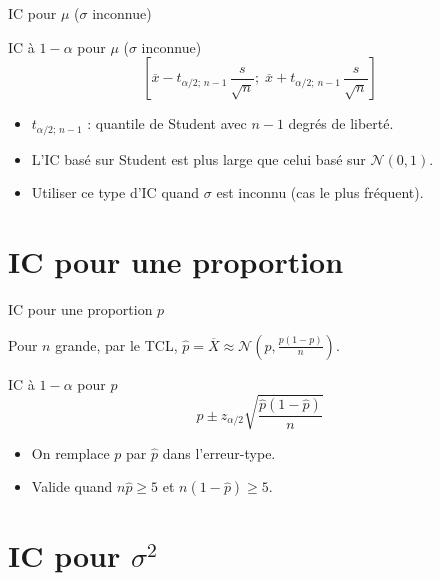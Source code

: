 \documentclass{BeamerTemplate}
\begin{document}
\begin{frame}[t]{IC pour $\mu$ ($\sigma$ inconnue)}

\begin{Boite}{IC à $1-\alpha$ pour $\mu$ ($\sigma$ inconnue)}
$$\left[\overline{x} - t_{\alpha/2;\, n-1}\,\frac{s}{\sqrt{n}};\; \overline{x} + t_{\alpha/2;\,n-1}\,\frac{s}{\sqrt{n}}\right]$$
\end{Boite}

\medskip
\begin{itemize}\itemsep4mm
  \item $t_{\alpha/2;\,n-1}$ : quantile de Student avec $n-1$ degrés de liberté.
  \item L'IC basé sur Student est \alert{plus large} que celui basé sur $\mathcal{N}(0,1)$.
  \item Utiliser ce type d'IC quand $\sigma$ est inconnu (cas le plus fréquent).
\end{itemize}

\end{frame}

\section{IC pour une proportion}

\begin{frame}[t]{IC pour une proportion $p$}

Pour $n$ grande, par le TCL, $\hat{p} = \overline{X} \approx \mathcal{N}\!\left(p, \frac{p(1-p)}{n}\right)$.

\begin{Boite}{IC à $1-\alpha$ pour $p$}
$$\hat{p} \pm z_{\alpha/2}\sqrt{\frac{\hat{p}(1-\hat{p})}{n}}$$
\end{Boite}

\medskip
\begin{itemize}\itemsep4mm
  \item On remplace $p$ par $\hat{p}$ dans l'erreur-type.
  \item Valide quand $n\hat{p} \ge 5$ et $n(1-\hat{p}) \ge 5$.
\end{itemize}

\end{frame}

\section{IC pour \texorpdfstring{$\sigma^2$}{sigma2}}
\end{document}
